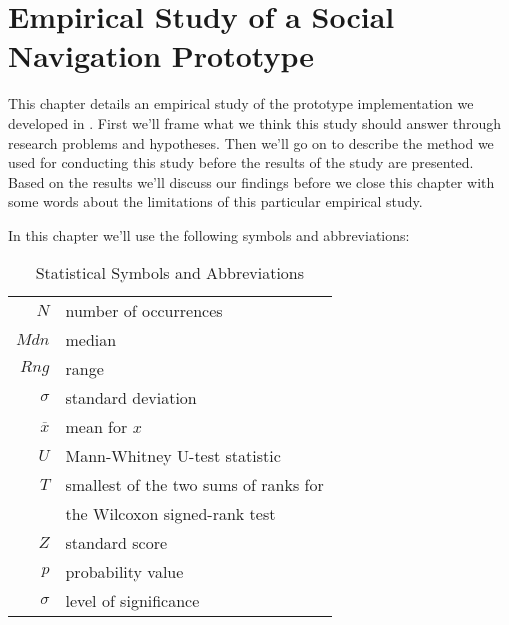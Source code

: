 \chapter{Empirical Study of a Social Navigation Prototype}
\label{chapter:empirical}

This chapter details an empirical study of the prototype implementation we
developed in . First we'll frame what we think this
study should answer through research problems and hypotheses. Then we'll go on
to describe the method we used for conducting this study before the results of
the study are presented. Based on the results we'll discuss our findings
before we close this chapter with some words about the limitations of this
particular empirical study.

In this chapter we'll use the following symbols and abbreviations:

\begin{table}[!h]
  \begin{tabular}{rl}

  $N$ & number of occurrences \\
  $Mdn$ & median \\
  $Rng$ & range \\
  $\sigma$ & standard deviation \\
  $\overline{x}$ & mean for $x$ \\
  $U$ & Mann-Whitney U-test statistic \\
  $T$ & smallest of the two sums of ranks for \\
      & the Wilcoxon signed-rank test \\
  $Z$ & standard score \\
  $p$ & probability value \\
  $\sigma$ & level of significance \\

  \end{tabular}

  \caption[Statistical Symbols]{Statistical Symbols and Abbreviations}
  \label{table:statistical.symbols}
\end{table}






